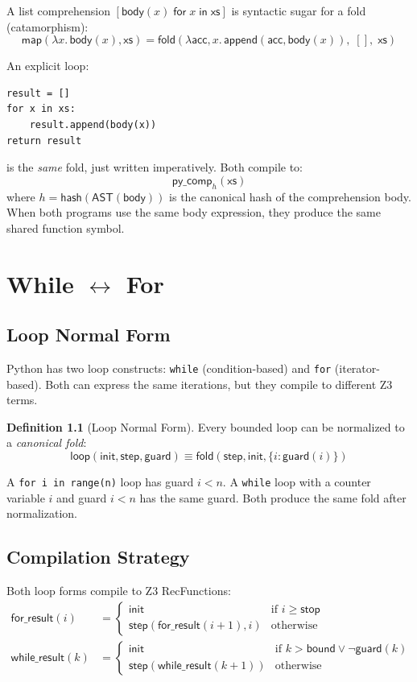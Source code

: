 \documentclass[11pt,a4paper]{report}
\theoremstyle{definition}
\newtheorem{definition}{Definition}[chapter]
\theoremstyle{plain}
\newcommand{\fold}{\mathsf{fold}}
\begin{document}
A list comprehension $[\mathsf{body}(x) \;\mathsf{for}\; x \;\mathsf{in}\; \mathsf{xs}]$
is syntactic sugar for a fold (catamorphism):
\[
  \mathsf{map}(\lambda x.\, \mathsf{body}(x), \mathsf{xs})
  = \fold(\lambda \mathsf{acc}, x.\, \mathsf{append}(\mathsf{acc},
    \mathsf{body}(x)),\; [],\; \mathsf{xs})
\]

An explicit loop:
\begin{lstlisting}
result = []
for x in xs:
    result.append(body(x))
return result
\end{lstlisting}

is the \emph{same} fold, just written imperatively.  Both compile to:
\[
  \mathsf{py\_comp}_{h}(\mathsf{xs})
\]
where $h = \mathsf{hash}(\mathsf{AST}(\mathsf{body}))$ is the
canonical hash of the comprehension body.  When both programs use the
same body expression, they produce the same shared function symbol.


\chapter{While $\leftrightarrow$ For}
\label{ch:while-for}

\section{Loop Normal Form}

Python has two loop constructs: \texttt{while} (condition-based) and
\texttt{for} (iterator-based).  Both can express the same iterations,
but they compile to different Z3 terms.

\begin{definition}[Loop Normal Form]
\label{def:lnf}
Every bounded loop can be normalized to a \emph{canonical fold}:
\[
  \mathsf{loop}(\mathsf{init}, \mathsf{step}, \mathsf{guard}) \equiv
  \fold(\mathsf{step}, \mathsf{init}, \{i : \mathsf{guard}(i)\})
\]
\end{definition}

A \texttt{for i in range(n)} loop has guard $i < n$.  A \texttt{while}
loop with a counter variable $i$ and guard $i < n$ has the same guard.
Both produce the same fold after normalization.

\section{Compilation Strategy}

Both loop forms compile to Z3 RecFunctions:
\begin{align}
  \mathsf{for\_result}(i) &= \begin{cases}
    \mathsf{init} & \text{if } i \geq \mathsf{stop} \\
    \mathsf{step}(\mathsf{for\_result}(i+1), i) & \text{otherwise}
  \end{cases} \\[6pt]
  \mathsf{while\_result}(k) &= \begin{cases}
    \mathsf{init} & \text{if } k > \mathsf{bound} \lor \lnot\mathsf{guard}(k) \\
    \mathsf{step}(\mathsf{while\_result}(k+1)) & \text{otherwise}
  \end{cases}
\end{align}
\end{document}
